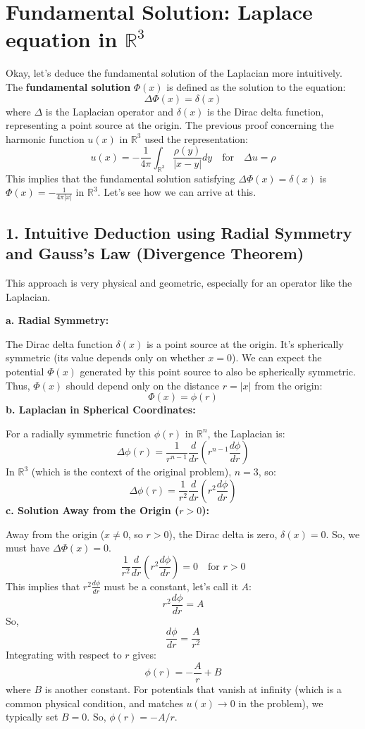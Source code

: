 \section{Fundamental Solution: Laplace equation in \texorpdfstring{$\mathbb{R}^{3}$}{mathbbR^3}}

Okay, let's deduce the fundamental solution of the Laplacian more intuitively. The \textbf{fundamental solution} $\Phi(x)$ is defined as the solution to the equation:
\[
\Delta \Phi(x) = \delta(x)
\]
where $\Delta$ is the Laplacian operator and $\delta(x)$ is the Dirac delta function, representing a point source at the origin. The previous proof concerning the harmonic function $u(x)$ in $\mathbb{R}^3$ used the representation:
\[
u(x) = -\frac{1}{4\pi} \int_{\mathbb{R}^3} \frac{\rho(y)}{|x-y|} dy \quad \text{for} \quad \Delta u = \rho
\]
This implies that the fundamental solution satisfying $\Delta \Phi(x) = \delta(x)$ is $\Phi(x) = -\frac{1}{4\pi|x|}$ in $\mathbb{R}^3$. Let's see how we can arrive at this.

\subsection{1. Intuitive Deduction using Radial Symmetry and Gauss's Law (Divergence Theorem)}

This approach is very physical and geometric, especially for an operator like the Laplacian.

\textbf{a. Radial Symmetry:}

The Dirac delta function $\delta(x)$ is a point source at the origin. It's spherically symmetric (its value depends only on whether $x=0$). We can expect the potential $\Phi(x)$ generated by this point source to also be spherically symmetric. Thus, $\Phi(x)$ should depend only on the distance $r = |x|$ from the origin:
\[
\Phi(x) = \phi(r)
\]
\textbf{b. Laplacian in Spherical Coordinates:}

For a radially symmetric function $\phi(r)$ in $\mathbb{R}^n$, the Laplacian is:
\[
\Delta \phi(r) = \frac{1}{r^{n-1}} \frac{d}{dr} \left( r^{n-1} \frac{d\phi}{dr} \right)
\]
In $\mathbb{R}^3$ (which is the context of the original problem), $n=3$, so:
\[
\Delta \phi(r) = \frac{1}{r^2} \frac{d}{dr} \left( r^2 \frac{d\phi}{dr} \right)
\]
\textbf{c. Solution Away from the Origin ($r > 0$):}

Away from the origin ($x \neq 0$, so $r > 0$), the Dirac delta is zero, $\delta(x) = 0$. So, we must have $\Delta \Phi(x) = 0$.
\[
\frac{1}{r^2} \frac{d}{dr} \left( r^2 \frac{d\phi}{dr} \right) = 0 \quad \text{for } r > 0
\]
This implies that $r^2 \frac{d\phi}{dr}$ must be a constant, let's call it $A$:
\[
r^2 \frac{d\phi}{dr} = A
\]
So,
\[
\frac{d\phi}{dr} = \frac{A}{r^2}
\]
Integrating with respect to $r$ gives:
\[
\phi(r) = -\frac{A}{r} + B
\]
where $B$ is another constant. For potentials that vanish at infinity (which is a common physical condition, and matches $u(x) \to 0$ in the problem), we typically set $B=0$. So, $\phi(r) = -A/r$.

